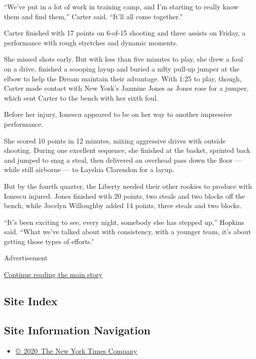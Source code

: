 ``We've put in a lot of work in training camp, and I'm starting to
really know them and find them,'' Carter said. ``It'll all come
together.''

Carter finished with 17 points on 6-of-15 shooting and three assists on
Friday, a performance with rough stretches and dynamic moments.

She missed shots early. But with less than five minutes to play, she
drew a foul on a drive, finished a scooping layup and buried a nifty
pull-up jumper at the elbow to help the Dream maintain their advantage.
With 1:25 to play, though, Carter made contact with New York's Jazmine
Jones as Jones rose for a jumper, which sent Carter to the bench with
her sixth foul.

Before her injury, Ionescu appeared to be on her way to another
impressive performance.

She scored 10 points in 12 minutes, mixing aggressive drives with
outside shooting. During one excellent sequence, she finished at the
basket, sprinted back and jumped to snag a steal, then delivered an
overhead pass down the floor --- while still airborne --- to Layshia
Clarendon for a layup.

But by the fourth quarter, the Liberty needed their other rookies to
produce with Ionescu injured. Jones finished with 20 points, two steals
and two blocks off the bench, while Jocelyn Willoughby added 14 points,
three steals and two blocks.

``It's been exciting to see, every night, somebody else has stepped
up,'' Hopkins said. ``What we've talked about with consistency, with a
younger team, it's about getting those types of efforts.''

Advertisement

\protect\hyperlink{after-bottom}{Continue reading the main story}

\hypertarget{site-index}{%
\subsection{Site Index}\label{site-index}}

\hypertarget{site-information-navigation}{%
\subsection{Site Information
Navigation}\label{site-information-navigation}}

\begin{itemize}
\tightlist
\item
  \href{https://help.nytimes.com/hc/en-us/articles/115014792127-Copyright-notice}{©~2020~The
  New York Times Company}
\end{itemize}

